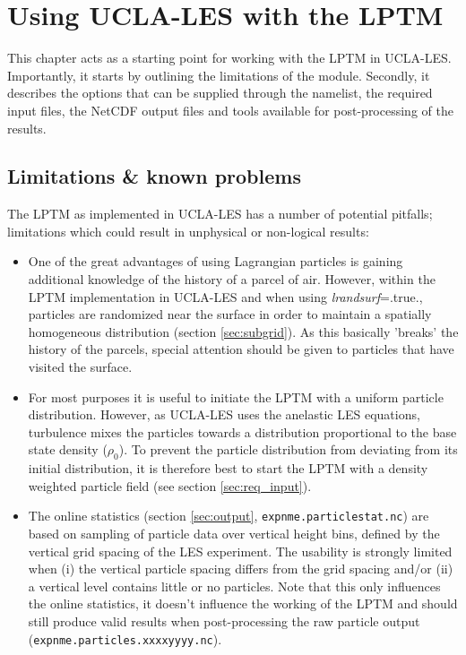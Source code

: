 \documentclass[twoside,a4paper]{report}
\begin{document}
\setcounter{page}{1}

\chapter{Using UCLA-LES with the LPTM}
\label{chap:usingLPTM}

This chapter acts as a starting point for working with the LPTM in UCLA-LES. Importantly, it starts by outlining the limitations of the module. Secondly, it describes the  
options that can be supplied through the namelist, the required input files, the NetCDF output files and tools available for post-processing of the results.\newline

\section{Limitations \& known problems}

The LPTM as implemented in UCLA-LES has a number of potential pitfalls; limitations which could result in unphysical or non-logical results:

\begin{itemize}
 \item One of the great advantages of using Lagrangian particles is gaining additional knowledge of the history of a parcel of air. However, within the LPTM implementation in UCLA-LES and when using \textit{lrandsurf}=.true., particles are randomized near the surface in order to maintain a spatially homogeneous distribution (section \ref{sec:subgrid}). As this basically 'breaks' the history of the parcels, special attention should be given to particles that have visited the surface.
 \item For most purposes it is useful to initiate the LPTM with a uniform particle distribution. However, as UCLA-LES uses the anelastic LES equations, turbulence mixes the particles towards a distribution proportional to the base state density ($\rho_0$). To prevent the particle distribution from deviating from its initial distribution, it is therefore best to start the LPTM with a density weighted particle field (see section \ref{sec:req_input}).
 \item The online statistics (section \ref{sec:output}, \texttt{expnme.particlestat.nc}) are based on sampling of particle data over vertical height bins, defined by the vertical grid spacing of the LES experiment. The usability is strongly limited when (i) the vertical particle spacing differs from the grid spacing and/or (ii) a vertical level contains little or no particles. Note that this only influences the online statistics, it doesn't influence the working of the LPTM and should still produce valid results when post-processing the raw particle output (\texttt{expnme.particles.xxxxyyyy.nc}).
\end{itemize}
\end{document}
